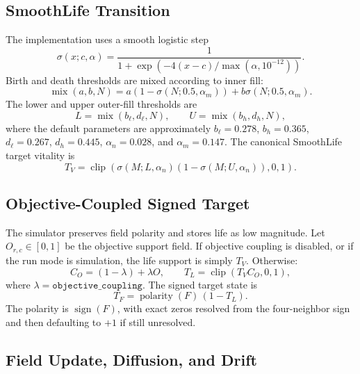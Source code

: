 \documentclass[11pt]{article}
\newcommand{\clip}{\operatorname{clip}}
\newcommand{\sign}{\operatorname{sign}}
\begin{document}
\subsection{SmoothLife Transition}

The implementation uses a smooth logistic step
\begin{equation}
\sigma(x;c,\alpha)=\frac{1}{1+\exp(-4(x-c)/\max(\alpha,10^{-12}))}.
\label{eq:sigmoid}
\end{equation}
Birth and death thresholds are mixed according to inner fill:
\begin{equation}
\operatorname{mix}(a,b,N)
= a(1-\sigma(N;0.5,\alpha_m)) + b\sigma(N;0.5,\alpha_m).
\label{eq:mix}
\end{equation}
The lower and upper outer-fill thresholds are
\begin{equation}
L = \operatorname{mix}(b_{\ell},d_{\ell},N),
\qquad
U = \operatorname{mix}(b_h,d_h,N),
\label{eq:thresholds}
\end{equation}
where the default parameters are approximately
$b_{\ell}=0.278$, $b_h=0.365$, $d_{\ell}=0.267$, $d_h=0.445$,
$\alpha_n=0.028$, and $\alpha_m=0.147$.
The canonical SmoothLife target vitality is
\begin{equation}
T_V = \clip\left(\sigma(M;L,\alpha_n)
\left(1-\sigma(M;U,\alpha_n)\right),0,1\right).
\label{eq:target-vitality}
\end{equation}

\subsection{Objective-Coupled Signed Target}

The simulator preserves field polarity and stores life as low magnitude. Let
$O_{r,c}\in[0,1]$ be the objective support field. If objective coupling is
disabled, or if the run mode is simulation, the life support is simply
$T_V$. Otherwise:
\begin{equation}
C_O = (1-\lambda) + \lambda O,
\qquad
T_L = \clip(T_V C_O,0,1),
\label{eq:life-support}
\end{equation}
where $\lambda=\texttt{objective\_coupling}$. The signed target state is
\begin{equation}
T_F = \operatorname{polarity}(F)\,(1-T_L).
\label{eq:signed-target}
\end{equation}
The polarity is $\sign(F)$, with exact zeros resolved from the four-neighbor
sign and then defaulting to $+1$ if still unresolved.

\subsection{Field Update, Diffusion, and Drift}
\end{document}
